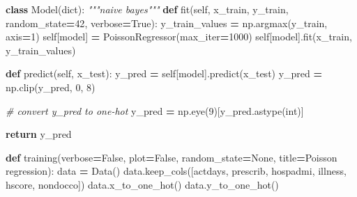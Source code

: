 \documentclass[
]{article}
\newenvironment{Shaded}{\begin{snugshade}}{\end{snugshade}}
\newcommand{\BuiltInTok}[1]{#1}
\newcommand{\CommentTok}[1]{\textcolor[rgb]{0.56,0.35,0.01}{\textit{#1}}}
\newcommand{\ControlFlowTok}[1]{\textcolor[rgb]{0.13,0.29,0.53}{\textbf{#1}}}
\newcommand{\DecValTok}[1]{\textcolor[rgb]{0.00,0.00,0.81}{#1}}
\newcommand{\KeywordTok}[1]{\textcolor[rgb]{0.13,0.29,0.53}{\textbf{#1}}}
\newcommand{\NormalTok}[1]{#1}
\newcommand{\OperatorTok}[1]{\textcolor[rgb]{0.81,0.36,0.00}{\textbf{#1}}}
\newcommand{\StringTok}[1]{\textcolor[rgb]{0.31,0.60,0.02}{#1}}
\newcommand{\VariableTok}[1]{\textcolor[rgb]{0.00,0.00,0.00}{#1}}
\begin{document}
\begin{Shaded}
\begin{Highlighting}[]

\KeywordTok{class}\NormalTok{ Model(}\BuiltInTok{dict}\NormalTok{):}
    \CommentTok{"""naive bayes"""}
    \KeywordTok{def}\NormalTok{ fit(}\VariableTok{self}\NormalTok{, x\_train, y\_train, random\_state}\OperatorTok{=}\DecValTok{42}\NormalTok{, verbose}\OperatorTok{=}\VariableTok{True}\NormalTok{):}
\NormalTok{        y\_train\_values }\OperatorTok{=}\NormalTok{ np.argmax(y\_train, axis}\OperatorTok{=}\DecValTok{1}\NormalTok{)}
        \VariableTok{self}\NormalTok{[}\StringTok{\textquotesingle{}model\textquotesingle{}}\NormalTok{] }\OperatorTok{=}\NormalTok{ PoissonRegressor(max\_iter}\OperatorTok{=}\DecValTok{1000}\NormalTok{)}
        \VariableTok{self}\NormalTok{[}\StringTok{\textquotesingle{}model\textquotesingle{}}\NormalTok{].fit(x\_train, y\_train\_values)}

    \KeywordTok{def}\NormalTok{ predict(}\VariableTok{self}\NormalTok{, x\_test):}
\NormalTok{        y\_pred }\OperatorTok{=} \VariableTok{self}\NormalTok{[}\StringTok{\textquotesingle{}model\textquotesingle{}}\NormalTok{].predict(x\_test)}
\NormalTok{        y\_pred }\OperatorTok{=}\NormalTok{ np.clip(y\_pred, }\DecValTok{0}\NormalTok{, }\DecValTok{8}\NormalTok{)}

        \CommentTok{\# convert y\_pred to one{-}hot}
\NormalTok{        y\_pred }\OperatorTok{=}\NormalTok{ np.eye(}\DecValTok{9}\NormalTok{)[y\_pred.astype(}\BuiltInTok{int}\NormalTok{)]}

        \ControlFlowTok{return}\NormalTok{ y\_pred}


\KeywordTok{def}\NormalTok{ training(verbose}\OperatorTok{=}\VariableTok{False}\NormalTok{, plot}\OperatorTok{=}\VariableTok{False}\NormalTok{, random\_state}\OperatorTok{=}\VariableTok{None}\NormalTok{, title}\OperatorTok{=}\StringTok{\textquotesingle{}Poisson regression\textquotesingle{}}\NormalTok{):}
\NormalTok{    data }\OperatorTok{=}\NormalTok{ Data()}
\NormalTok{    data.keep\_cols([}\StringTok{\textquotesingle{}actdays\textquotesingle{}}\NormalTok{, }\StringTok{\textquotesingle{}prescrib\textquotesingle{}}\NormalTok{, }\StringTok{\textquotesingle{}hospadmi\textquotesingle{}}\NormalTok{, }
                    \StringTok{\textquotesingle{}illness\textquotesingle{}}\NormalTok{, }\StringTok{\textquotesingle{}hscore\textquotesingle{}}\NormalTok{, }\StringTok{\textquotesingle{}nondocco\textquotesingle{}}\NormalTok{])}
\NormalTok{    data.x\_to\_one\_hot()}
\NormalTok{    data.y\_to\_one\_hot()}


\end{Highlighting}
\end{Shaded}
\end{document}
